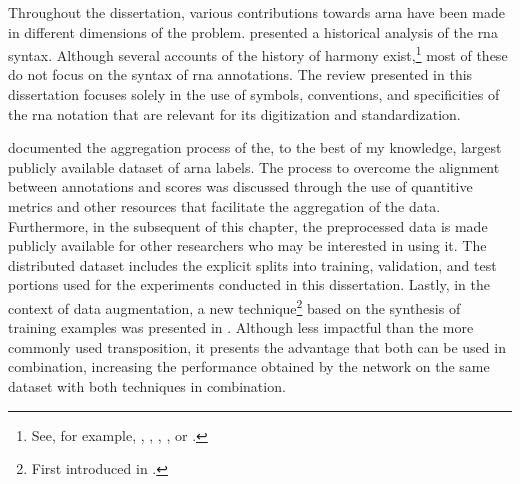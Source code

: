 
Throughout the dissertation, various contributions towards
\gls{arna} have been made in different dimensions of the
problem. 
presented a historical analysis of the \gls{rna} syntax.
Although several accounts of the history of harmony
exist,\footnote{See, for example,
\textcite{wason1985viennese}, \textcite{grave1988praise},
\textcite{christensen2002tonality},
\textcite{laitz2010graduate}, or
\textcite{sansallovich2013quintas}.} most of these do not
focus on the syntax of \gls{rna} annotations. The review
presented in this dissertation focuses solely in the use of
symbols, conventions, and specificities of the \gls{rna}
notation that are relevant for its digitization and
standardization.

 documented the
aggregation process of the, to the best of my knowledge,
largest publicly available dataset of \gls{arna} labels. The
process to overcome the alignment between annotations and
scores was discussed through the use of quantitive metrics
and other resources that facilitate the aggregation of the
data. Furthermore, in the subsequent
 of this chapter, the
preprocessed data is made publicly available for other
researchers who may be interested in using it. The
distributed dataset includes the explicit splits into
training, validation, and test portions used for the
experiments conducted in this dissertation. Lastly, in the
context of data augmentation, a new technique\footnote{First
introduced in \textcite{napoleslopez2021augmentednet}.}
based on the synthesis of training examples was presented in
. Although
less impactful than the more commonly used transposition, it
presents the advantage that both can be used in combination,
increasing the performance obtained by the network on the
same dataset with both techniques in combination.

